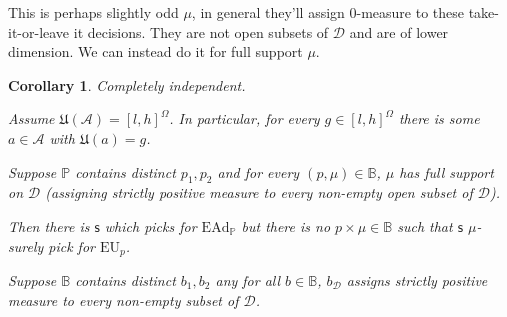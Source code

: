 \documentclass[a4paper]{article}
\newtheorem{corollary}[theorem]{Corollary}
\newcommand\A{\mathcal{A}}
\renewcommand\P{\mathbb{P}} %
\newcommand\EU{\mathrm{EU}}
\newcommand\EAd{\mathrm{EAd}}
\newcommand\U{\mathfrak{U}} %
\newcommand{\Decs}{\mathcal{D}}
\newcommand\s{\mathsf{s}}
\newcommand{\IB}{\mathbb{B}}
\newcommand{\IP}{\P}
\newenvironment{CCM rewritten}
{\begingroup\color{blue}} %
{\endgroup}              %
\begin{document}
This is perhaps slightly odd $\mu$, in general they'll assign 0-measure to these take-it-or-leave it decisions. They are not open subsets of $\Decs$ and are of lower dimension. We can instead do it for full support $\mu$. 

\begin{corollary}Completely independent. 
	
	Assume $\U(\A)=[l,h]^\Omega$. In particular, for every $g\in [l,h]^\Omega$ there is some $a\in \A$ with $\U(a)=g$. 
	
	Suppose $\IP$ contains distinct $p_1,p_2$ and for every $(p,\mu)\in\IB$, $\mu$ has full support on $\Decs$ (assigning strictly positive measure to every non-empty open subset of $\Decs$).
	
	Then there is $\s$ which picks for $\EAd_\IP$ but there is no $p\times\mu\in \IB$ such that $\s$ $\mu$-surely pick for $\EU_p$.
	
	Suppose $\IB$ contains distinct $b_1,b_2$ any for all $b\in\IB$, $b_\Decs$ assigns strictly positive measure to every non-empty subset of $\Decs$. 
\end{corollary}
\end{document}
